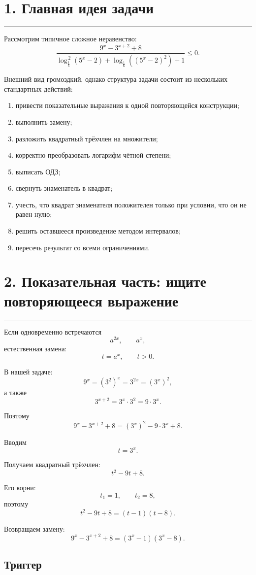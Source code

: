 \documentclass[a4paper,12pt]{article}
\newcommand{\topicline}{%
  \par\noindent
  {\color{accent!55}\rule{\linewidth}{0.6pt}}
  \par
}
\begin{document}
\section*{\color{darkaccent}1. Главная идея задачи}
\topicline

Рассмотрим типичное сложное неравенство:
\[
\frac{
9^x-3^{x+2}+8
}{
\log_{\frac16}^{\,2}(5^x-2)
+
\log_{\frac16}\!\left((5^x-2)^2\right)
+1
}
\le 0.
\]

Внешний вид громоздкий, однако структура задачи состоит из нескольких стандартных действий:

\begin{enumerate}
\item привести показательные выражения к одной повторяющейся конструкции;
\item выполнить замену;
\item разложить квадратный трёхчлен на множители;
\item корректно преобразовать логарифм чётной степени;
\item выписать ОДЗ;
\item свернуть знаменатель в квадрат;
\item учесть, что квадрат знаменателя положителен только при условии, что он не равен нулю;
\item решить оставшееся произведение методом интервалов;
\item пересечь результат со всеми ограничениями.
\end{enumerate}

\section*{\color{darkaccent}2. Показательная часть: ищите повторяющееся выражение}
\topicline

Если одновременно встречаются
\[
a^{2x},\qquad a^x,
\]
естественная замена:
\[
t=a^x,\qquad t>0.
\]

В нашей задаче:
\[
9^x=(3^2)^x=3^{2x}=(3^x)^2,
\]
а также
\[
3^{x+2}=3^x\cdot3^2=9\cdot3^x.
\]

Поэтому
\[
9^x-3^{x+2}+8
=
(3^x)^2-9\cdot3^x+8.
\]

Вводим
\[
t=3^x.
\]

Получаем квадратный трёхчлен:
\[
t^2-9t+8.
\]

Его корни:
\[
t_1=1,\qquad t_2=8,
\]
поэтому
\[
t^2-9t+8=(t-1)(t-8).
\]

Возвращаем замену:
\[
\boxed{
9^x-3^{x+2}+8
=
(3^x-1)(3^x-8)
}.
\]

\subsection*{\color{accent}Триггер}
\end{document}
